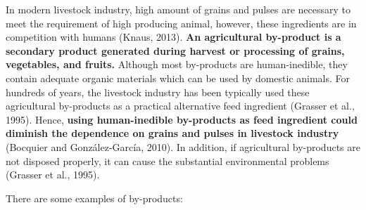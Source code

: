 \documentclass[]{book}
\begin{document}
In modern livestock industry, high amount of grains and pulses are necessary to meet the requirement of high producing animal, however, these ingredients are in competition with humans (Knaus, 2013). \textbf{An agricultural by-product is a secondary product generated during harvest or processing of grains, vegetables, and fruits.} Although most by-products are human-inedible, they contain adequate organic materials which can be used by domestic animals. For hundreds of years, the livestock industry has been typically used these agricultural by-products as a practical alternative feed ingredient (Grasser et al., 1995). Hence, \textbf{using human-inedible by-products as feed ingredient could diminish the dependence on grains and pulses in livestock industry} (Bocquier and González-García, 2010). In addition, if agricultural by-products are not disposed properly, it can cause the substantial environmental problems (Grasser et al., 1995).

There are some examples of by-products:
\end{document}
